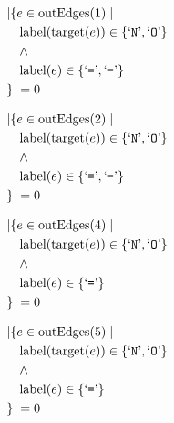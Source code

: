 \begin{align*}
&|\{e \in \mathrm{outEdges}(1)  \mid \\
&\quad \mathrm{label}(\mathrm{target}(e)) \in \{ \text{`\texttt{N}'},  \text{`\texttt{O}'} \}\\
&\quad \wedge\\
&\quad \mathrm{label}(e) \in \{ \text{`\texttt{=}'},  \text{`\texttt{-}'} \}\\
&\}| = 0
\end{align*}

\begin{align*}
&|\{e \in \mathrm{outEdges}(2)  \mid \\
&\quad \mathrm{label}(\mathrm{target}(e)) \in \{ \text{`\texttt{N}'},  \text{`\texttt{O}'} \}\\
&\quad \wedge\\
&\quad \mathrm{label}(e) \in \{ \text{`\texttt{=}'},  \text{`\texttt{-}'} \}\\
&\}| = 0
\end{align*}

\begin{align*}
&|\{e \in \mathrm{outEdges}(4)  \mid \\
&\quad \mathrm{label}(\mathrm{target}(e)) \in \{ \text{`\texttt{N}'},  \text{`\texttt{O}'} \}\\
&\quad \wedge\\
&\quad \mathrm{label}(e) \in \{ \text{`\texttt{=}'} \}\\
&\}| = 0
\end{align*}

\begin{align*}
&|\{e \in \mathrm{outEdges}(5)  \mid \\
&\quad \mathrm{label}(\mathrm{target}(e)) \in \{ \text{`\texttt{N}'},  \text{`\texttt{O}'} \}\\
&\quad \wedge\\
&\quad \mathrm{label}(e) \in \{ \text{`\texttt{=}'} \}\\
&\}| = 0
\end{align*}

